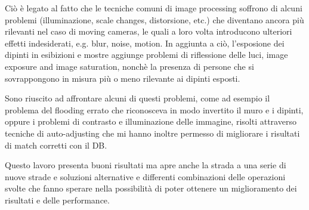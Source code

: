 \documentclass[10pt,twocolumn,letterpaper]{article}
\begin{document}
Ciò è legato al fatto che le tecniche comuni di image processing soffrono di alcuni problemi (illuminazione, scale changes, distorsione, etc.) che diventano ancora più rilevanti nel caso di moving cameras, le quali a loro volta introducono ulteriori effetti indesiderati, e.g. blur, noise, motion. 
In aggiunta a ciò, l'esposione dei dipinti in esibizioni e mostre aggiunge problemi di riflessione delle luci, image exposure and image saturation, nonchè la presenza di persone che si sovrappongono in misura più o meno rilevante ai dipinti esposti.

Sono riuscito ad affrontare alcuni di questi problemi, come ad esempio il problema del flooding errato che riconosceva in modo invertito il muro e i dipinti, oppure i problemi di contrasto e illuminazione delle immagine, risolti attraverso tecniche di auto-adjusting che mi hanno inoltre permesso di migliorare i risultati di match corretti con il DB.

Questo lavoro presenta buoni risultati ma apre anche la strada a una serie di nuove strade e soluzioni alternative e differenti combinazioni delle operazioni svolte che fanno sperare nella possibilità di poter ottenere un miglioramento dei risultati e delle performance.


{\small


}
\end{document}
